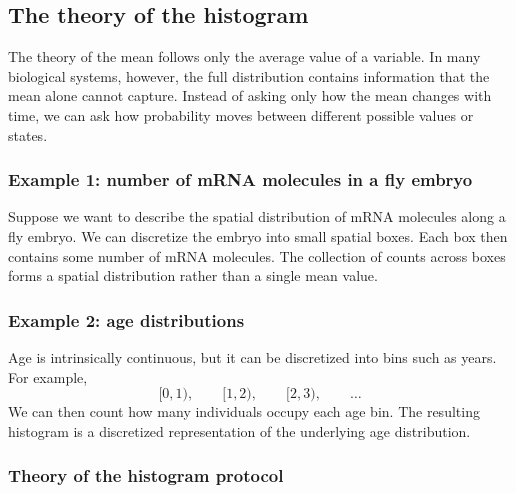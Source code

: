 

\subsection{The theory of the histogram}
\label{sec:histogram}



The theory of the mean follows only the average value of a variable.
In many biological systems, however, the full distribution contains information that the mean alone cannot capture.
Instead of asking only how the mean changes with time, we can ask how probability moves between different possible values or states.

\subsubsection*{Example 1: number of mRNA molecules in a fly embryo}

Suppose we want to describe the spatial distribution of mRNA molecules along a fly embryo.
We can discretize the embryo into small spatial boxes.
Each box then contains some number of mRNA molecules.
The collection of counts across boxes forms a spatial distribution rather than a single mean value.


\subsubsection*{Example 2: age distributions}

Age is intrinsically continuous, but it can be discretized into bins such as years.
For example,
\[
    [0,1), \qquad [1,2), \qquad [2,3), \qquad \ldots
\]
We can then count how many individuals occupy each age bin.
The resulting histogram is a discretized representation of the underlying age distribution.


\subsubsection{Theory of the histogram protocol}

